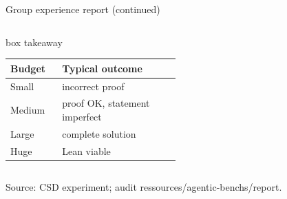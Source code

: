 \documentclass[aspectratio=169]{beamer}
\newenvironment{takeawaybox}{\begin{beamercolorbox}[wd=\linewidth,rounded=true,sep=1.0mm]{box takeaway}}{\end{beamercolorbox}}
\begin{document}
\begin{frame}{Group experience report (continued)}
\begin{columns}[T,onlytextwidth]
\begin{takeawaybox}
\tiny
\renewcommand{\arraystretch}{0.82}
\begin{tabular}{@{}p{0.28\linewidth}p{0.64\linewidth}@{}}
\toprule
Budget & Typical outcome \\
\midrule
\rowcolor{softRed}
Small & incorrect proof \\
\rowcolor{softAmber}
Medium & proof OK, statement imperfect \\
\rowcolor{softTeal}
Large & complete solution \\
\rowcolor{softGreen}
Huge & Lean viable \\
\bottomrule
\end{tabular}
\end{takeawaybox}
\end{columns}
\vspace{-2.0mm}
{\tiny\color{aiSlate}Source: CSD experiment; audit ressources/agentic-benchs/report.\par}
\end{frame}
\end{document}

